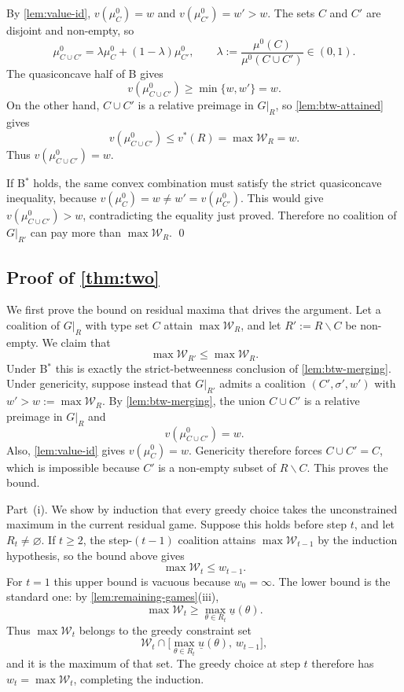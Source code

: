 \documentclass[11pt]{article}
\newcommand{\W}{\mathcal{W}}
\begin{document}
By \cref{lem:value-id}, $v(\mu^0_C)=w$ and $v(\mu^0_{C'})=w'>w$. The sets $C$ and $C'$ are disjoint and non-empty, so
\[
    \mu^0_{C\cup C'}
    =
    \lambda\mu^0_C+(1-\lambda)\mu^0_{C'},
    \qquad
    \lambda:=\frac{\mu^0(C)}{\mu^0(C\cup C')}\in(0,1).
\]
The quasiconcave half of B gives
\[
    v(\mu^0_{C\cup C'})\geq \min\{w,w'\}=w.
\]
On the other hand, $C\cup C'$ is a relative preimage in $G\vert_R$, so \cref{lem:btw-attained} gives
\[
    v(\mu^0_{C\cup C'})\leq v^*(R)=\max\W_R=w.
\]
Thus $v(\mu^0_{C\cup C'})=w$.

If B$^*$ holds, the same convex combination must satisfy the strict quasiconcave inequality, because $v(\mu^0_C)=w\neq w'=v(\mu^0_{C'})$. This would give $v(\mu^0_{C\cup C'})>w$, contradicting the equality just proved. Therefore no coalition of $G\vert_{R'}$ can pay more than $\max\W_R$.
\qed

\subsection*{Proof of \cref{thm:two}}
We first prove the bound on residual maxima that drives the argument. Let a coalition of $G\vert_R$ with type set $C$ attain $\max\W_R$, and let $R':=R\smallsetminus C$ be non-empty. We claim that
\[
    \max\W_{R'}\leq\max\W_R .
\]
Under B$^*$ this is exactly the strict-betweenness conclusion of \cref{lem:btw-merging}. Under genericity, suppose instead that $G\vert_{R'}$ admits a coalition $(C',\sigma',w')$ with $w'>w:=\max\W_R$. By \cref{lem:btw-merging}, the union $C\cup C'$ is a relative preimage in $G\vert_R$ and
\[
    v(\mu^0_{C\cup C'})=w.
\]
Also, \cref{lem:value-id} gives $v(\mu^0_C)=w$. Genericity therefore forces $C\cup C'=C$, which is impossible because $C'$ is a non-empty subset of $R\smallsetminus C$. This proves the bound.

Part~(i). We show by induction that every greedy choice takes the unconstrained maximum in the current residual game. Suppose this holds before step $t$, and let $R_t\neq\varnothing$. If $t\geq2$, the step-$(t-1)$ coalition attains $\max\W_{t-1}$ by the induction hypothesis, so the bound above gives
\[
    \max\W_t\leq w_{t-1}.
\]
For $t=1$ this upper bound is vacuous because $w_0=\infty$. The lower bound is the standard one: by \cref{lem:remaining-games}(iii),
\[
    \max\W_t\geq\max_{\theta\in R_t}\underline u(\theta).
\]
Thus $\max\W_t$ belongs to the greedy constraint set
\[
    \W_t\cap\bigl[\max_{\theta\in R_t}\underline u(\theta),\,w_{t-1}\bigr],
\]
and it is the maximum of that set. The greedy choice at step $t$ therefore has $w_t=\max\W_t$, completing the induction.
\end{document}

